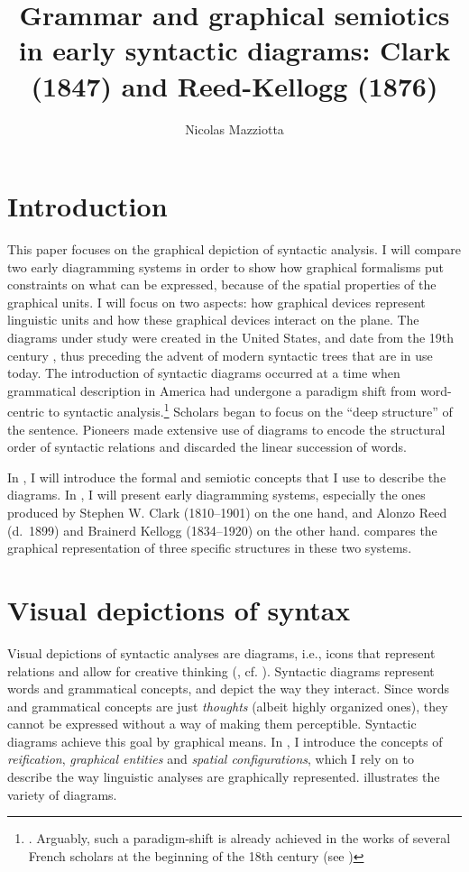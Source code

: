 \documentclass[output=paper]{langsci/langscibook}
\author{Nicolas Mazziotta\affiliation{Université de Liège}}
\title{Grammar and graphical semiotics in early syntactic diagrams: Clark (1847) and Reed-Kellogg (1876)}
\begin{document}
\maketitle

\section{Introduction}\label{sec:4:1}

This paper focuses on the graphical depiction of syntactic analysis. I will compare two early diagramming systems in order to show how graphical formalisms put constraints on what can be expressed, because of the spatial properties of the graphical units. I will focus on two aspects: how graphical devices represent linguistic units and how these graphical devices interact on the plane. The diagrams under study were created in the United States, and date from the 19th century \citep{brittain_critical_1973}, thus preceding the advent of modern syntactic trees that are in use today. The introduction of syntactic diagrams occurred at a time when grammatical description in America had undergone a paradigm shift from word-centric to syntactic analysis.\footnote{\textrm{\citet[76]{aarts_handbook_2006}. Arguably, such a paradigm-shift is already achieved in the works of several French scholars at the beginning of the 18th century (see \citealt{imrenyi_how_2020})}} Scholars began to focus on the “deep structure” of the sentence. Pioneers made extensive use of diagrams to encode the structural order of syntactic relations and discarded the linear succession of words. 

In , I will introduce the formal and semiotic concepts that I use to describe the diagrams. In , I will present early diagramming systems, especially the ones produced by Stephen W. Clark (1810–1901) on the one hand, and Alonzo Reed (d.~1899) and Brainerd Kellogg (1834–1920) on the other hand.  compares the graphical representation of three specific structures in these two systems.

\section{Visual depictions of syntax}\label{sec:4:2}

Visual depictions of syntactic analyses are diagrams, i.e., icons that represent relations and allow for creative thinking (\citealt{peirce_collected_1994}, cf. \citealt[36--42]{chauvire_oeil_2008}). Syntactic diagrams represent words and grammatical concepts, and depict the way they interact. Since words and grammatical concepts are just \textit{thoughts} (albeit highly organized ones), they cannot be expressed without a way of making them perceptible. Syntactic diagrams achieve this goal by graphical means. In , I introduce the concepts of \textit{reification}, \textit{graphical entities} and \textit{spatial configurations}, which I rely on to describe the way linguistic analyses are graphically represented.  illustrates the variety of diagrams. 
\end{document}
